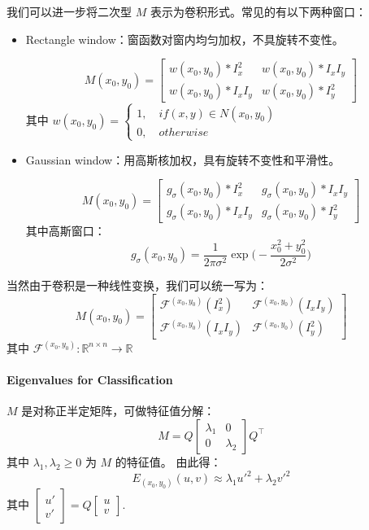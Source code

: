 我们可以进一步将二次型 \(M\) 表示为卷积形式。常见的有以下两种窗口：

\begin{itemize}
\item
  Rectangle window：窗函数对窗内均匀加权，不具旋转不变性。

  \[
  M(x_0,y_0)
  =
  \begin{bmatrix}
  w(x_0,y_0) * I_x^2 & w(x_0,y_0) * I_x I_y \\
  w(x_0,y_0) * I_x I_y & w(x_0,y_0) * I_y^2
  \end{bmatrix}
  \] 其中
  \(w(x_0, y_0) = \begin{cases} 1, \quad if (x, y) \in N(x_0, y_0) \\ 0, \quad otherwise\end{cases}\)
\item
  Gaussian window：用高斯核加权，具有旋转不变性和平滑性。

  \[
  M(x_0,y_0)
  =
  \begin{bmatrix}
  g_\sigma(x_0,y_0) * I_x^2 & g_\sigma(x_0,y_0) * I_x I_y \\
  g_\sigma(x_0,y_0) * I_x I_y & g_\sigma(x_0,y_0) * I_y^2
  \end{bmatrix}
  \] 其中高斯窗口： \[
  g_\sigma(x_0,y_0) = \frac{1}{2\pi\sigma^2} \exp \big(-\frac{x_0^2+y_0^2}{2\sigma^2}\big)
  \]
\end{itemize}

当然由于卷积是一种线性变换，我们可以统一写为： \[
M(x_0,y_0)
=
\begin{bmatrix}
\mathcal{F}^{(x_0, y_0)}(I_x^2) & \mathcal{F}^{(x_0, y_0)}(I_x I_y) \\
\mathcal{F}^{(x_0, y_0)}(I_x I_y) & \mathcal{F}^{(x_0, y_0)}(I_y^2)
\end{bmatrix}
\] 其中
\(\mathcal{F}^{(x_0, y_0)}: \mathbb{R}^{n \times n} \rightarrow \mathbb{R}\)

\paragraph{Eigenvalues for
Classification}\label{eigenvalues-for-classification}

\(M\) 是对称正半定矩阵，可做特征值分解： \[
M = Q \begin{bmatrix} \lambda_1 & 0 \\ 0 & \lambda_2 \end{bmatrix} Q^\top
\] 其中 \(\lambda_1, \lambda_2 \ge 0\) 为 \(M\) 的特征值。 由此得： \[
E_{(x_0, y_0)}(u, v) \approx \lambda_1 u'^2 + \lambda_2 v'^2
\] 其中
\(\begin{bmatrix} u' \\ v' \end{bmatrix} = Q \begin{bmatrix} u \\ v \end{bmatrix}\).

